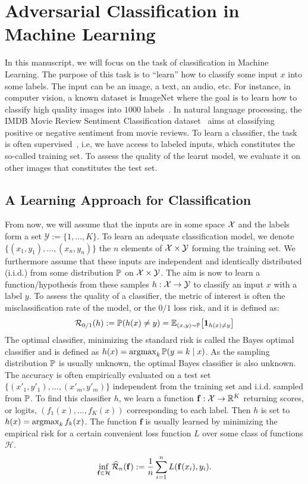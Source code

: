 \section{Adversarial Classification in Machine Learning}

In this manuscript, we will focus on the task of classification in Machine Learning. The purpose of this task is to ``learn'' how to classify some input $x$ into some labels. The input can be an image, a text, an audio, etc. For instance, in computer vision, a known dataset is ImageNet where the goal is to learn how to classify high quality images into $1000$ labels~\citep{imagenet_cvpr09}. In natural language processing, the IMDB Movie Review Sentiment Classification dataset~\citep{maas-EtAl:2011:ACL-HLT2011} aims at classifying positive or negative sentiment from movie reviews. To learn a classifier, the task is often supervised~\citep{friedman2001elements}, i.e, we have access to labeled inputs, which constitutes the so-called training set. To assess the quality of the learnt model, we evaluate it on other images that constitutes the test set.

\subsection{A Learning Approach for Classification}
From now, we will assume that the inputs are in some space $\mathcal{X}$ and the labels form a set $\mathcal{Y}:=\{1,\dots,K\}$. To learn an adequate classification model, we denote $\{(x_1,y_1),\dots,(x_n,y_n)\}$ the $n$ elements of $\mathcal{X}\times\mathcal{Y}$ forming the training set. We furthermore assume that these inputs are independent and identically distributed (i.i.d.) from some distribution $\mathbb{P}$ on $\mathcal{X}\times\mathcal{Y}$. The aim is now to learn a function/hypothesis from these samples $h:\mathcal{X}\to\mathcal{Y}$ to classify an input $x$ with a label $y$. To assess the quality of a classifier, the metric of interest is often the misclassification rate of the model, or the $0/1$ loss risk, and it is defined as:
\begin{align*}
\risk_{0/1}(h):=\PP(h(x)\neq y) = \EE_{(x,y)\sim\PP}\left[\mathbf{1}_{h(x)\neq y}\right]
\end{align*}
The optimal classifier, minimizing the standard risk is called the Bayes optimal classifier and is defined as $h(x) = \operatorname*{argmax}_k\mathbb{P}(y=k\mid x)$.
As the sampling distribution $\mathbb{P}$ is usually unknown, the optimal Bayes classifier is also unknown. The accuracy is often empirically evaluated on a test set $\{(x'_1,y'_1),\dots,(x'_m,y'_m)\}$ independent from the training set and i.i.d. sampled from $\mathbb{P}$.  To find this classifier $h$, we learn a function $\mathbf{f}:\mathcal{X}\to\mathbb{R}^K$ returning scores, or logits, $(f_1(x),\dots,f_K(x))$ corresponding to each label. Then $h$ is set to $h(x)=\operatorname*{argmax}_k f_k(x)$. The function $\mathbf{f}$ is usually learned by minimizing the empirical risk for a certain convenient loss function $L$ over some class of functions $\mathcal{H}$.
\begin{align*}
\inf_{\mathbf{f}\in\mathcal{H}}\widehat{\mathcal{R}}_{n}(\mathbf{f}):= \frac{1}{n}\sum_{i=1}^nL(\mathbf{f}(x_i),y_i).
\end{align*}

